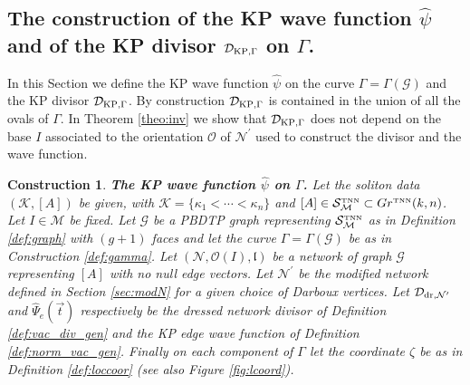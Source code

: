 \documentclass[11pt]{amsart}
\theoremstyle{plain}
\numberwithin{equation}{section}
\newtheorem{construction}{Construction}[subsection]
\def \GTNN {{Gr^{\mbox{\tiny TNN}} (k,n)}}
\def \DKP {{\mathcal D}_{\textup{\scriptsize KP},\Gamma}}
\def \DDN {{\mathcal D}_{\textup{\scriptsize dr},{\mathcal N}^{\prime}}}
\def \S {{\mathcal S}_{\mathcal M}^{\mbox{\tiny TNN}}}
\begin{document}
\subsection{The construction of the KP wave function $\hat \psi$ and of the KP divisor $\DKP$ on $\Gamma$.}\label{sec:inv}

In this Section we define the KP wave function $\hat \psi$ on the curve $\Gamma=\Gamma (\mathcal G)$ and the KP divisor $\DKP$. By construction $\DKP$ is contained in the union of all the ovals of $\Gamma$. In Theorem \ref{theo:inv} we show that $\DKP$ does not depend on the base $I$ associated to the orientation $\mathcal O$ of $\mathcal N^{\prime}$ used to construct the divisor and the wave function. 

\begin{construction}\label{con:dress_gen}\textbf{The KP wave function $\hat \psi$ on $\Gamma$.}
Let the soliton data $({\mathcal K}, [A])$ be given, with $\mathcal K = \{ \kappa_1 < \cdots < \kappa_n\}$ and $[A]\in \S \subset \GTNN$. Let $I\in \mathcal M$ be fixed.
Let $\mathcal G$ be a PBDTP graph representing $\S$ as in Definition \ref{def:graph} with $(g+1)$ faces and let the curve $\Gamma=\Gamma(\mathcal G)$ be as in Construction \ref{def:gamma}.  
Let $({\mathcal N}, \mathcal O(I), \mathfrak l)$ be a network of graph $\mathcal G$ representing $[A]$ with no null edge vectors. Let ${\mathcal N}^{\prime}$ be the modified network defined in Section \ref{sec:modN} for a given choice of Darboux vertices. Let $\DDN$ and $\hat \Psi_{e} (\vec t)$ respectively be the dressed network divisor of Definition \ref{def:vac_div_gen} and the KP edge wave function of Definition \ref{def:norm_vac_gen}. Finally on each component of $\Gamma$ let the coordinate $\zeta$ be as in Definition \ref{def:loccoor} (see also Figure \ref{fig:lcoord}).


\end{construction}
\end{document}
